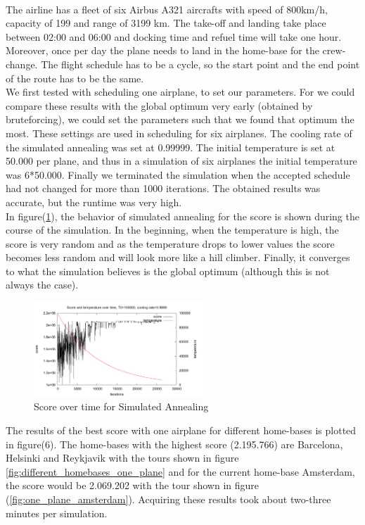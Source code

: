 \documentclass[journal]{IEEEtran}
\begin{document}
\\
The airline has a fleet of six Airbus A321 aircrafts with speed of 800km/h, capacity of 199 and range of 3199 km. The take-off and landing take place between 02:00 and 06:00 and docking time and refuel time will take one hour. Moreover, once per day the plane needs to land in the home-base for the crew-change. The flight schedule has to be a cycle, so the start point and the end point of the route has to be the same.\\
We first tested with scheduling one airplane, to set our parameters. For we could compare these results with the global optimum very early (obtained by bruteforcing), we could set the parameters such that we found that optimum the most. These settings are used in scheduling for six airplanes. The cooling rate of the simulated annealing was set at 0.99999. The initial temperature is set at 50.000 per plane, and thus in a simulation of six airplanes the initial temperature was 6*50.000. Finally we terminated the simulation when the accepted schedule had not changed for more than 1000 iterations. The obtained results was accurate, but the runtime was very high. \\
In figure(\ref{fig:simulated_annealing_score}), the behavior of simulated annealing for the score is shown during the course of the simulation. In the beginning, when the temperature is high, the score is very random and as the temperature drops to lower values the score becomes less random and will look more like a hill climber. Finally, it converges to what the simulation believes is the global optimum (although this is not always the case).\\
\begin{figure}[H]
\centering
\includegraphics[width=2.5in]{score_over_time}
\caption{Score over time for Simulated Annealing}
\label{fig:simulated_annealing_score}
\end{figure}
The results of the best score with one airplane for different home-bases is plotted in figure(6). The home-bases with the highest score (2.195.766) are Barcelona, Helsinki and Reykjavik with the tours shown in figure \ref{fig:different_homebases_one_plane} and for the current home-base Amsterdam, the score would be 2.069.202 with the tour shown in figure (\ref{fig:one_plane_amsterdam}). Acquiring these results took about two-three minutes per simulation.
\end{document}
